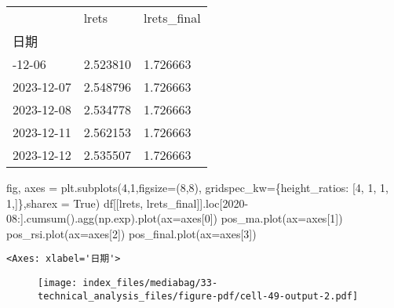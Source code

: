 \documentclass[
  letterpaper,
  DIV=11,
  numbers=noendperiod]{scrreprt}
\newenvironment{Shaded}{\begin{snugshade}}{\end{snugshade}}
\newcommand{\DecValTok}[1]{\textcolor[rgb]{0.68,0.00,0.00}{#1}}
\newcommand{\NormalTok}[1]{\textcolor[rgb]{0.00,0.23,0.31}{#1}}
\newcommand{\OperatorTok}[1]{\textcolor[rgb]{0.37,0.37,0.37}{#1}}
\newcommand{\StringTok}[1]{\textcolor[rgb]{0.13,0.47,0.30}{#1}}
\newcommand{\VariableTok}[1]{\textcolor[rgb]{0.07,0.07,0.07}{#1}}
\begin{document}
\begin{longtable}[]{@{}lll@{}}
\toprule\noalign{}
& lrets & lrets\_final \\
日期 & & \\
\midrule\noalign{}
\endhead
\bottomrule\noalign{}
\endlastfoot
2023-12-06 & 2.523810 & 1.726663 \\
2023-12-07 & 2.548796 & 1.726663 \\
2023-12-08 & 2.534778 & 1.726663 \\
2023-12-11 & 2.562153 & 1.726663 \\
2023-12-12 & 2.535507 & 1.726663 \\
\end{longtable}

\begin{Shaded}
\begin{Highlighting}[]
\NormalTok{fig, axes }\OperatorTok{=}\NormalTok{ plt.subplots(}\DecValTok{4}\NormalTok{,}\DecValTok{1}\NormalTok{,figsize}\OperatorTok{=}\NormalTok{(}\DecValTok{8}\NormalTok{,}\DecValTok{8}\NormalTok{), gridspec\_kw}\OperatorTok{=}\NormalTok{\{}\StringTok{\textquotesingle{}height\_ratios\textquotesingle{}}\NormalTok{: [}\DecValTok{4}\NormalTok{, }\DecValTok{1}\NormalTok{, }\DecValTok{1}\NormalTok{, }\DecValTok{1}\NormalTok{,]\},sharex }\OperatorTok{=} \VariableTok{True}\NormalTok{)}
\NormalTok{df[[}\StringTok{\textquotesingle{}lrets\textquotesingle{}}\NormalTok{, }\StringTok{\textquotesingle{}lrets\_final\textquotesingle{}}\NormalTok{]].loc[}\StringTok{\textquotesingle{}2020{-}08\textquotesingle{}}\NormalTok{:].cumsum().agg(np.exp).plot(ax}\OperatorTok{=}\NormalTok{axes[}\DecValTok{0}\NormalTok{])}
\NormalTok{pos\_ma.plot(ax}\OperatorTok{=}\NormalTok{axes[}\DecValTok{1}\NormalTok{])}
\NormalTok{pos\_rsi.plot(ax}\OperatorTok{=}\NormalTok{axes[}\DecValTok{2}\NormalTok{])}
\NormalTok{pos\_final.plot(ax}\OperatorTok{=}\NormalTok{axes[}\DecValTok{3}\NormalTok{])}
\end{Highlighting}
\end{Shaded}

\begin{verbatim}
<Axes: xlabel='日期'>
\end{verbatim}

\begin{figure}[H]

{\centering \texttt{[image: index\_files/mediabag/33-technical\_analysis\_files/figure-pdf/cell-49-output-2.pdf]}

}

\end{figure}
\end{document}
